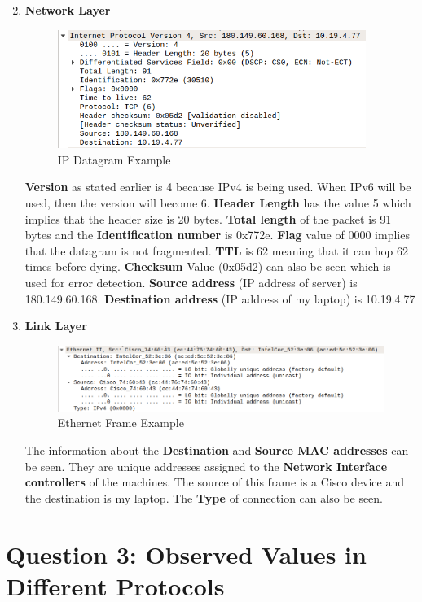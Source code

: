 \documentclass[a4paper,10pt]{article}
\newlength{\strutheight}
\begin{document}
\begin{enumerate}
\begin{adjustbox}{valign=T,raise=\strutheight,minipage={\linewidth}}
	\end{adjustbox} 
	\pagebreak
	\item \textbf{\color{Magenta} \large Network Layer }\\
	\begin{adjustbox}{valign=T,raise=\strutheight,minipage={\linewidth}}
		\begin{figure}
			\includegraphics[width=10cm]{Images/IpEx}
			\caption{IP Datagram Example}
		\end{figure}
		\strut{}
		\textbf{Version} as stated earlier is 4 because IPv4 is being used. When IPv6 will be used, then the version will become 6. \textbf{Header Length} has the value 5 which implies that the header size is 20 bytes. \textbf{Total length} of the packet is 91 bytes and the \textbf{Identification number} is 0x772e. \textbf{Flag} value of 0000 implies that the datagram is not fragmented. \textbf{TTL} is 62 meaning that it can hop 62 times before dying. \textbf{Checksum} Value (0x05d2) can also be seen which is used for error detection. \textbf{Source address} (IP address of server) is 180.149.60.168. \textbf{Destination address} (IP address of my laptop) is 10.19.4.77
	\end{adjustbox} 
	\item \textbf{\color{Magenta} \large Link Layer }\\
	\begin{adjustbox}{valign=T,raise=\strutheight,minipage={\linewidth}}
		\begin{figure}
			\includegraphics[width=12cm]{Images/linkEx}
			\caption{Ethernet Frame Example}
		\end{figure}
		\strut{}
		The information about the \textbf{Destination} and \textbf{Source MAC addresses} can be seen. They are unique addresses assigned to the \textbf{Network Interface controllers} of the machines. The source of this frame is a Cisco device and the destination is my laptop. The \textbf{Type} of connection can also be seen.
	\end{adjustbox} 
\end{enumerate}

\section*{Question 3: Observed Values in Different Protocols}
\end{document}
